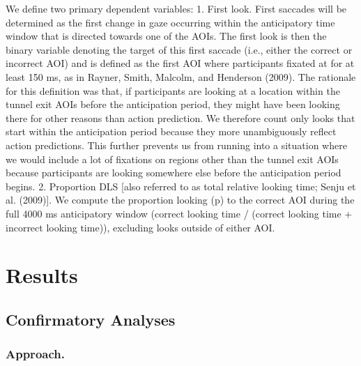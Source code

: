 \documentclass[
  man,floatsintext]{apa6}
\begin{document}
We define two primary dependent variables:
1. First look. First saccades will be determined as the first change in gaze occurring within the anticipatory time window that is directed towards one of the AOIs. The first look is then the binary variable denoting the target of this first saccade (i.e., either the correct or incorrect AOI) and is defined as the first AOI where participants fixated at for at least 150 ms, as in Rayner, Smith, Malcolm, and Henderson (2009). The rationale for this definition was that, if participants are looking at a location within the tunnel exit AOIs before the anticipation period, they might have been looking there for other reasons than action prediction. We therefore count only looks that start within the anticipation period because they more unambiguously reflect action predictions. This further prevents us from running into a situation where we would include a lot of fixations on regions other than the tunnel exit AOIs because participants are looking somewhere else before the anticipation period begins.
2. Proportion DLS {[}also referred to as total relative looking time; Senju et al. (2009){]}. We compute the proportion looking (p) to the correct AOI during the full 4000 ms anticipatory window (correct looking time / (correct looking time + incorrect looking time)), excluding looks outside of either AOI.

\section{Results}\label{results}

\subsection{Confirmatory Analyses}\label{confirmatory-analyses}

\subsubsection{Approach.}\label{approach.}
\end{document}
